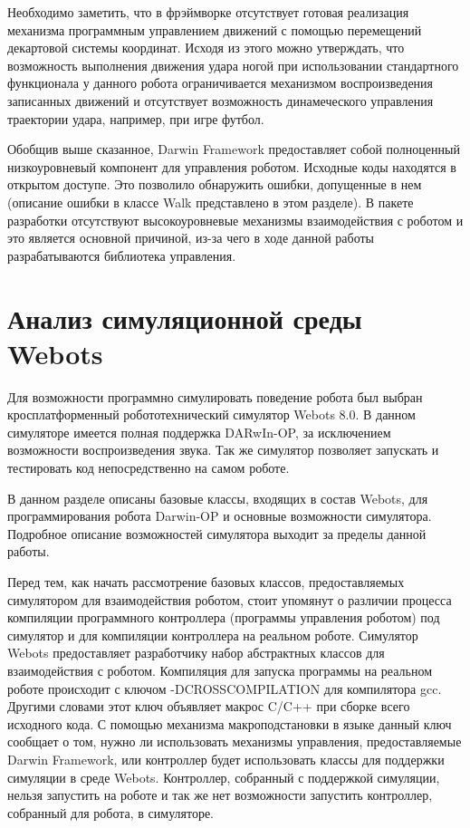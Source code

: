 Необходимо заметить, что в фрэймворке отсутствует готовая реализация механизма программным управлением движений с помощью перемещений декартовой системы координат. Исходя из этого можно утверждать, что возможность выполнения движения удара ногой при использовании стандартного функционала у данного робота ограничивается механизмом воспроизведения записанных движений и отсутствует возможность динамеческого управления траектории удара, например, при игре футбол.

Обобщив выше сказанное, Darwin Framework предоставляет собой полноценный низкоуровневый компонент для управления роботом. Исходные коды находятся в открытом доступе. Это позволило обнаружить ошибки, допущенные в нем (описание ошибки в классе Walk представлено в этом разделе). В пакете разработки отсутствуют высокоуровневые механизмы взаимодействия с роботом и это является основной причиной, из-за чего в ходе данной работы разрабатываются библиотека управления.

\section{Анализ симуляционной среды Webots}

Для возможности программно симулировать поведение робота был выбран кросплатформенный робототехнический симулятор Webots 8.0. В данном симуляторе имеется полная поддержка DARwIn-OP, за исключением возможности воспроизведения звука. Так же симулятор позволяет запускать и тестировать код непосредственно на самом роботе.

В данном разделе описаны базовые классы, входящих в состав Webots, для программирования робота Darwin-OP и основные возможности симулятора. Подробное описание возможностей симулятора выходит за пределы данной работы. 

Перед тем, как начать рассмотрение базовых классов, предоставляемых симулятором для взаимодействия роботом, стоит упомянут о различии процесса компиляции программного контроллера (программы управления роботом) под симулятор и для компиляции контроллера на реальном роботе. Симулятор Webots предоставляет разработчику набор абстрактных классов для взаимодействия с роботом. Компиляция для запуска программы на реальном роботе происходит с ключом -DCROSSCOMPILATION для компилятора gcc. Другими словами этот ключ объявляет макрос C/C++ при сборке всего исходного кода. С помощью механизма макроподстановки в языке данный ключ сообщает о том, нужно ли использовать механизмы управления, предоставляемые Darwin Framework, или контроллер будет использовать классы для поддержки симуляции в среде Webots. Контроллер, собранный с поддержкой симуляции, нельзя запустить на роботе и так же нет возможности запустить контроллер, собранный для робота, в симуляторе.

